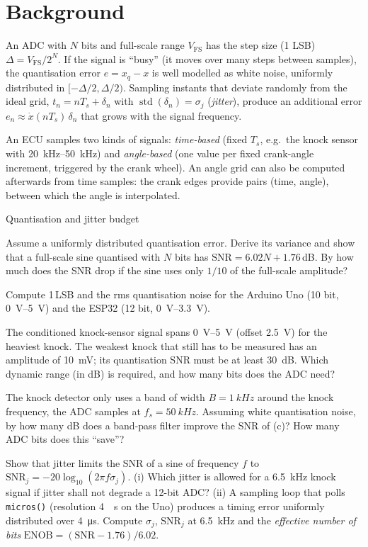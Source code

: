\section*{Background}

An ADC with $N$ bits and full-scale range $V_\mathrm{FS}$ has the step size
(1 LSB) $\Delta = V_\mathrm{FS}/2^N$. If the signal is ``busy'' (it moves
over many steps between samples), the quantisation error
$e=x_q-x$ is well modelled as white noise, uniformly distributed in
$[-\Delta/2,\Delta/2)$. Sampling instants that deviate randomly from the
ideal grid, $t_n = nT_s+\delta_n$ with $\operatorname{std}(\delta_n)=\sigma_j$
(\emph{jitter}), produce an additional error $e_n\approx\dot x(nT_s)\,\delta_n$
that grows with the signal frequency.

An ECU samples two kinds of signals: \emph{time-based} (fixed $T_s$, e.g.\ the
knock sensor with \SIrange{20}{50}{kHz}) and \emph{angle-based} (one value per
fixed crank-angle increment, triggered by the crank wheel). An angle grid can
also be computed afterwards from time samples: the crank edges provide
pairs (time, angle), between which the angle is interpolated.

\begin{exercise}{Quantisation and jitter budget}{\Paper}
\begin{tasks}
  \item Assume a uniformly distributed quantisation error. Derive its
    variance and show that a full-scale sine quantised with $N$ bits has
    $\mathrm{SNR}=6.02N+1.76$\,dB. By how much does the SNR drop if the sine
    uses only $1/10$ of the full-scale amplitude?
  \item Compute 1\,LSB and the rms quantisation noise for the Arduino Uno
    (10 bit, \SIrange{0}{5}{V}) and the ESP32 (12 bit, \SIrange{0}{3.3}{V}).
  \item The conditioned knock-sensor signal spans \SIrange{0}{5}{V} (offset
    \SI{2.5}{V}) for the heaviest knock. The weakest knock that still has to be
    measured has an amplitude of \SI{10}{mV}; its quantisation SNR must be at
    least \SI{30}{dB}. Which dynamic range (in dB) is required, and how many
    bits does the ADC need?
  \item The knock detector only uses a band of width $B=\SI{1}{kHz}$ around
    the knock frequency, the ADC samples at $f_s=\SI{50}{kHz}$. Assuming white
    quantisation noise, by how many dB does a band-pass filter improve the SNR
    of (c)? How many ADC bits does this ``save''?
  \item Show that jitter limits the SNR of a sine of frequency $f$ to
    $\mathrm{SNR}_j=-20\log_{10}(2\pi f\sigma_j)$. (i) Which jitter is allowed
    for a \SI{6.5}{kHz} knock signal if jitter shall not degrade a 12-bit ADC?
    (ii) A sampling loop that polls \texttt{micros()} (resolution \SI{4}{\micro
    s} on the Uno) produces a timing error uniformly distributed over
    \SI{4}{\micro s}. Compute $\sigma_j$, $\mathrm{SNR}_j$ at \SI{6.5}{kHz}
    and the \emph{effective number of bits}
    $\mathrm{ENOB}=(\mathrm{SNR}-1.76)/6.02$.
\end{tasks}
\end{exercise}

